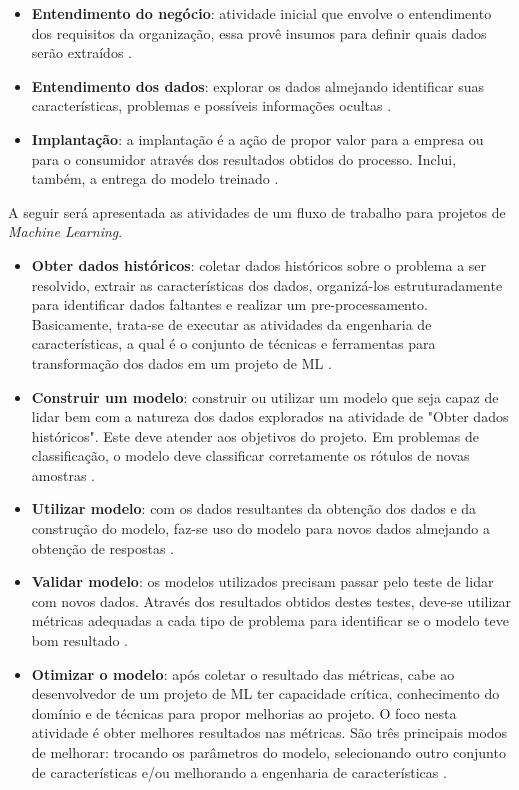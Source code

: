 \begin{itemize}
	\item \textbf{Entendimento do negócio}: atividade inicial que envolve o entendimento dos requisitos da organização, essa provê insumos para definir quais dados serão extraídos \cite{CHAPMAN2000}. 
    \item \textbf{Entendimento dos dados}: explorar os dados almejando identificar suas características, problemas e possíveis informações ocultas \cite{CHAPMAN2000}.
    \item \textbf{Implantação}: a implantação é a ação de propor valor para a empresa ou para o consumidor através dos resultados obtidos do processo. Inclui, também, a entrega do modelo treinado \cite{CHAPMAN2000}.
\end{itemize}

A seguir será apresentada as atividades de um fluxo de trabalho para projetos de \textit{Machine Learning}.

\begin{itemize}
	\item \textbf{Obter dados históricos}: coletar dados históricos sobre o problema a ser resolvido, extrair as características dos dados, organizá-los estruturadamente para identificar dados faltantes e realizar um pre-processamento. Basicamente, trata-se de executar as atividades da engenharia de características, a qual é o conjunto de técnicas e ferramentas para transformação dos dados em um projeto de ML \cite{BRINK2015}.
    \item \textbf{Construir um modelo}: construir ou utilizar um modelo que seja capaz de lidar bem com a natureza dos dados explorados na atividade de "Obter dados históricos". Este deve atender aos objetivos do projeto. Em problemas de classificação, o modelo deve classificar corretamente os rótulos de novas amostras \cite{BRINK2015}.
    \item \textbf{Utilizar modelo}: com os dados resultantes da obtenção dos dados e da construção do modelo, faz-se uso do modelo para novos dados almejando a obtenção de respostas \cite{BRINK2015}.
    \item \textbf{Validar modelo}: os modelos utilizados precisam passar pelo teste de lidar com novos dados. Através dos resultados obtidos destes testes, deve-se utilizar métricas adequadas a cada tipo de problema para identificar se o modelo teve bom resultado \cite{BRINK2015}.
    \item \textbf{Otimizar o modelo}: após coletar o resultado das métricas, cabe ao desenvolvedor de um projeto de ML ter capacidade crítica, conhecimento do domínio e de técnicas para propor melhorias ao projeto. O foco nesta atividade é obter melhores resultados nas métricas. São três principais modos de melhorar: trocando os parâmetros do modelo, selecionando outro conjunto de características e/ou melhorando a engenharia de características \cite{BRINK2015}.
\end{itemize}

